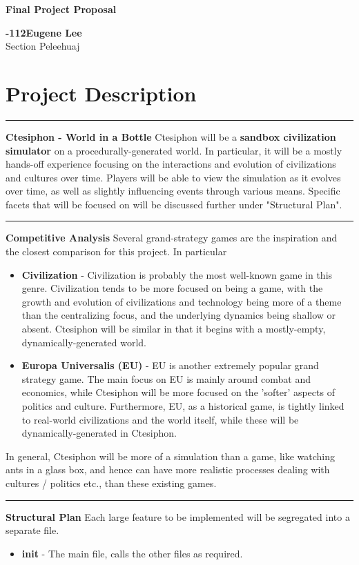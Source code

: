 \documentclass[11pt, onecolumn]{article}
\newcommand{\titleName}{Final Project Proposal}
\newcommand{\class}{15-112}
\newcommand{\recitation}{P}
\newcommand{\heading}[1]{\section*{#1}
\hrule
\vspace*{0.5\baselineskip}}
\begin{document}
{\noindent\Huge\bf {\selectfont  \titleName}}\\[1.0\baselineskip] 
{ {\bf {}\selectfont \class  \hfill {\large Eugene Lee}}\\
Section \recitation \hfill eleehuaj
\\[0.5\baselineskip]
\heading{Project Description}
\textbf{\large{Ctesiphon - World in a Bottle}}
Ctesiphon will be a \textbf{sandbox civilization simulator} on a procedurally-generated world. In particular, it will be a mostly hands-off experience focusing on the interactions and evolution of civilizations and cultures over time. Players will be able to view the simulation as it evolves over time, as well as slightly influencing events through various means. Specific facets that will be focused on will be discussed further under "Structural Plan".
\\
\hrule
\textbf{\large{Competitive Analysis}}
Several grand-strategy games are the inspiration and the closest comparison for this project. In particular
\begin{itemize}
    \item \textbf{Civilization} - Civilization is probably the most well-known game in this genre. Civilization tends to be more focused on being a game, with the growth and evolution of civilizations and technology being more of a theme than the centralizing focus, and the underlying dynamics being shallow or absent. Ctesiphon will be similar in that it begins with a mostly-empty, dynamically-generated world.
    \item \textbf{Europa Universalis (EU)} - EU is another extremely popular grand strategy game. The main focus on EU is mainly around combat and economics, while Ctesiphon will be more focused on the 'softer' aspects of politics and culture. Furthermore, EU, as a historical game, is tightly linked to real-world civilizations and the world itself, while these will be dynamically-generated in Ctesiphon.
\end{itemize}
In general, Ctesiphon will be more of a simulation than a game, like watching ants in a glass box, and hence can have more realistic processes dealing with cultures / politics etc., than these existing games.
\\
\hrule
\textbf{\large{Structural Plan}}
Each large feature to be implemented will be segregated into a separate file.
\begin{itemize}
    \item \textbf{init} - The main file, calls the other files as required.

\end{itemize}}
\end{document}
